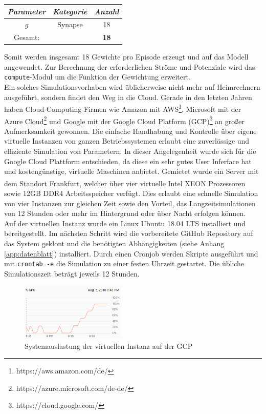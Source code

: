 		\begin{center}
			\begin{tabular}{c@{\hskip 0.5cm}c@{\hskip 0.5cm}c@{\hskip 0.5cm}}    \toprule
				\setlength{\tabcolsep}{50pt}
				\renewcommand{\arraystretch}{1.5}
				\emph{Parameter}	& \emph{Kategorie}  & \emph{Anzahl} \\\midrule
				$g$					& Synapse			& 18			\\\bottomrule
				Gesamt:				&					& \textbf{18}	\\
				\hline
			\end{tabular}
		\end{center}
		Somit werden insgesamt 18 Gewichte pro Episode erzeugt und auf das Modell angewendet. Zur Berechnung der erforderlichen Ströme und Potenziale wird das \texttt{compute}-Modul um die Funktion der Gewichtung erweitert.\\
		Ein solches Simulationsvorhaben wird üblicherweise nicht mehr auf Heimrechnern ausgeführt, sondern findet den Weg in die Cloud. Gerade in den letzten Jahren haben Cloud-Computing-Firmen wie Amazon mit AWS\footnote{https://aws.amazon.com/de/}, Microsoft mit der Azure Cloud\footnote{https://azure.microsoft.com/de-de/} und Google mit der Google Cloud Platform (GCP)\footnote{https://cloud.google.com/} an großer Aufmerksamkeit gewonnen. Die einfache Handhabung und Kontrolle über eigene virtuelle Instanzen von ganzen Betriebssystemen erlaubt eine zuverlässige und effiziente Simulation von Parametern. In dieser Angelegenheit wurde sich für die Google Cloud Plattform entschieden, da diese ein sehr gutes User Inferface hat und kostengünstige, virtuelle Maschinen anbietet. Gemietet wurde ein Server mit dem Standort Frankfurt, welcher über vier virtuelle Intel XEON\textsuperscript{\textregistered} Prozessoren sowie 12GB DDR4 Arbeitsspeicher verfügt. Dies erlaubt eine schnelle Simulation von vier Instanzen zur gleichen Zeit sowie den Vorteil, das Langzeitsimulationen von 12 Stunden oder mehr im Hintergrund oder über Nacht erfolgen können.\\
		Auf der virtuellen Instanz wurde ein Linux Ubuntu 18.04 LTS installiert und bereitgestellt. Im nächsten Schritt wird die vorbereitete GitHub Repository auf das System geklont und die benötigten Abhängigkeiten (siehe Anhang \ref{app:datenblatt}) installiert. Durch einen Cronjob werden Skripte ausgeführt und mit \texttt{crontab -e} die Simulation zu einer festen Uhrzeit gestartet. Die übliche Simulationszeit beträgt jeweils 12 Stunden.
		\begin{figure}[H] %
			\centering
			\includegraphics[width=5cm]{figures/chap_implement/GCP.png}
			\caption{Systemauslastung der virtuellen Instanz auf der GCP}
			\label{fig:gcp_1}
		\end{figure}
